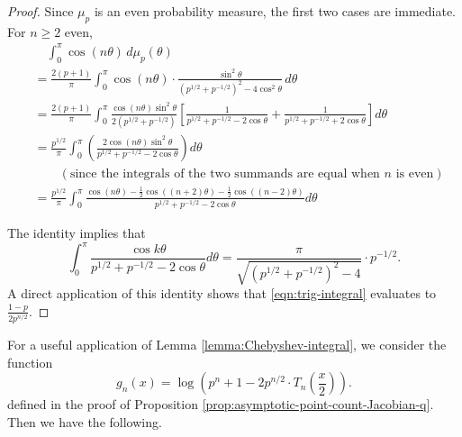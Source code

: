 \documentclass[11pt,letterpaper,reqno]{amsart}
\theoremstyle{definition}
\numberwithin{equation}{section}
\numberwithin{figure}{section}
\numberwithin{table}{section}
\begin{document}
\begin{proof}
    Since $\mu_p$ is an even probability measure, the first two cases are immediate. For $n \geq 2$ even,
\begin{align}
& \quad \int_{0}^\pi \cos(n \theta) \, d \mu_p(\theta)\\
&= \frac{2(p+1)}{\pi} \int_{0}^{\pi} \cos (n \theta) \cdot \frac{\sin^2\theta}{(p^{1/2} + p^{-1/2})^2 - 4\cos^2\theta} \, d\theta \\
&= \frac{2(p+1)}{\pi} \int_{0}^{\pi} \frac{\cos\left( n\theta \right) \sin^2\theta}{2(p^{1/2}+p^{-1/2})} \left[ \frac{1}{p^{1/2}+p^{-1/2} - 2\cos\theta}  + \frac{1}{p^{1/2}+p^{-1/2} + 2\cos\theta} \right] d\theta \\
&= \frac{p^{1/2}}{\pi} \int_{0}^{\pi} \left( \frac{2\cos(n\theta) \sin^2\theta}{p^{1/2}+p^{-1/2} - 2\cos\theta} \right) d\theta\\
& \qquad \left( \text{since the integrals of the two summands are equal when $n$ is even}  \right)\\
&= \frac{p^{1/2}}{\pi}\int_{0}^\pi \frac{\cos (n \theta) - \frac{1}{2} \cos\left( (n + 2) \theta\right) - \frac{1}{2} \cos \left( (n - 2) \theta \right)}{ p^{1/2} + p^{-1/2} - 2 \cos \theta} d\theta \label{eqn:trig-integral}
\end{align}

The identity \cite[(3.613.2)]{gradshteyn2014table} implies that
$$\int_{0}^\pi \frac{\cos k \theta}{p^{1/2} + p^{-1/2} - 2 \cos \theta} d \theta = \frac{\pi}{\sqrt{\left( p^{1/2} + p^{-1/2} \right)^2 - 4}} \cdot p^{-1/2}.$$
A direct application of this identity shows that \eqref{eqn:trig-integral} evaluates to $\frac{1 - p}{2 p^{n/2}}.$
\end{proof}

For a useful application of Lemma \ref{lemma:Chebyshev-integral}, we consider the function
$$g_n(x) = \log \left( p^n + 1 - 2p^{n/2} \cdot T_n \left(  \frac{x}{2} \right)  \right).$$
defined in the proof of Proposition \ref{prop:asymptotic-point-count-Jacobian-q}. Then we have the following.
\end{document}
